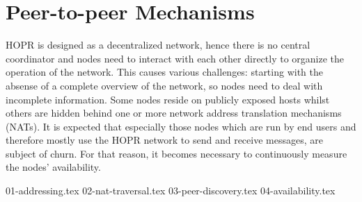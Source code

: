 \section{Peer-to-peer Mechanisms}

HOPR is designed as a decentralized network, hence there is no central coordinator and nodes need to interact with each other directly to organize the operation of the network. This causes various challenges: starting with the absense of a complete overview of the network, so nodes need to deal with incomplete information. Some nodes reside on publicly exposed hosts whilst others are hidden behind one or more network address translation mechanisms (NATs). It is expected that especially those nodes which are run by end users and therefore mostly use the HOPR network to send and receive messages, are subject of churn. For that reason, it becomes necessary to continuously measure the nodes' availability.

{01-addressing.tex}
{02-nat-traversal.tex}
{03-peer-discovery.tex}
{04-availability.tex}






